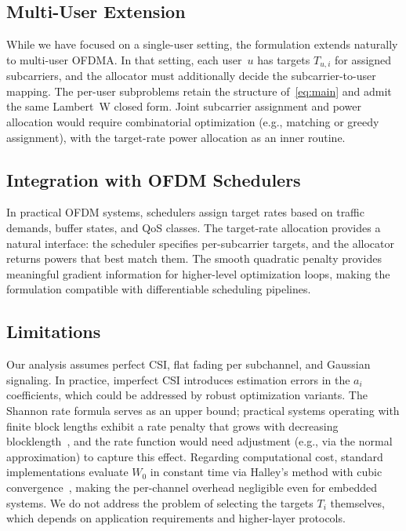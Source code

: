\documentclass[journal]{IEEEtran}
\begin{document}
\subsection{Multi-User Extension}

While we have focused on a single-user setting, the formulation extends naturally to multi-user OFDMA.
In that setting, each user~$u$ has targets $T_{u,i}$ for assigned subcarriers, and the allocator must additionally decide the subcarrier-to-user mapping.
The per-user subproblems retain the structure of~\eqref{eq:main} and admit the same Lambert~W closed form.
Joint subcarrier assignment and power allocation would require combinatorial optimization (e.g., matching or greedy assignment), with the target-rate power allocation as an inner routine.

\subsection{Integration with OFDM Schedulers}

In practical OFDM systems, schedulers assign target rates based on traffic demands, buffer states, and QoS classes.
The target-rate allocation provides a natural interface: the scheduler specifies per-subcarrier targets, and the allocator returns powers that best match them.
The smooth quadratic penalty provides meaningful gradient information for higher-level optimization loops, making the formulation compatible with differentiable scheduling pipelines.

\subsection{Limitations}

Our analysis assumes perfect CSI, flat fading per subchannel, and Gaussian signaling.
In practice, imperfect CSI introduces estimation errors in the $a_i$ coefficients, which could be addressed by robust optimization variants.
The Shannon rate formula serves as an upper bound; practical systems operating with finite block lengths exhibit a rate penalty that grows with decreasing blocklength~\cite{coverandthomas2006}, and the rate function would need adjustment (e.g., via the normal approximation) to capture this effect.
Regarding computational cost, standard implementations evaluate $W_0$ in constant time via Halley's method with cubic convergence~\cite{corless1996lambertw}, making the per-channel overhead negligible even for embedded systems.
We do not address the problem of selecting the targets $T_i$ themselves, which depends on application requirements and higher-layer protocols.
\end{document}
